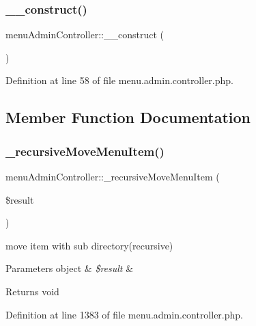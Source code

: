 \subsubsection{\texorpdfstring{\+\_\+\+\_\+construct()}{\_\_construct()}}
{\footnotesize\ttfamily menu\+Admin\+Controller\+::\+\_\+\+\_\+construct (\begin{DoxyParamCaption}{ }\end{DoxyParamCaption})}



Definition at line 58 of file menu.\+admin.\+controller.\+php.



\subsection{Member Function Documentation}
\mbox{\label{classmenuAdminController_a663ff3838dde914ecaa1cd2875ce6848}} 
\subsubsection{\texorpdfstring{\+\_\+recursive\+Move\+Menu\+Item()}{\_recursiveMoveMenuItem()}}
{\footnotesize\ttfamily menu\+Admin\+Controller\+::\+\_\+recursive\+Move\+Menu\+Item (\begin{DoxyParamCaption}\item[{}]{\$result }\end{DoxyParamCaption})}

move item with sub directory(recursive) 
\begin{DoxyParams}[1]{Parameters}
object & {\em \$result} & \\
\hline
\end{DoxyParams}
\begin{DoxyReturn}{Returns}
void 
\end{DoxyReturn}


Definition at line 1383 of file menu.\+admin.\+controller.\+php.

\mbox{\label{classmenuAdminController_a0eee3e8dfe3a4f9af9bd76f4776951cb}} 
